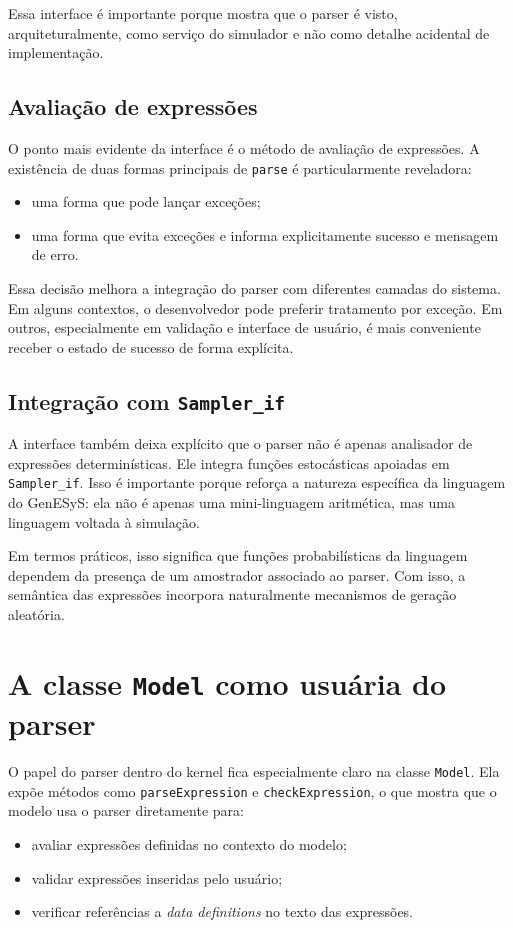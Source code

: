 Essa interface é importante porque mostra que o parser é visto, arquiteturalmente, como serviço do simulador e não como detalhe acidental de implementação.

\subsection{Avaliação de expressões}
\label{subsec:cap9_avaliacao_expressoes}

O ponto mais evidente da interface é o método de avaliação de expressões. A existência de duas formas principais de \texttt{parse} é particularmente reveladora:
\begin{itemize}
    \item uma forma que pode lançar exceções;
    \item uma forma que evita exceções e informa explicitamente sucesso e mensagem de erro.
\end{itemize}

Essa decisão melhora a integração do parser com diferentes camadas do sistema. Em alguns contextos, o desenvolvedor pode preferir tratamento por exceção. Em outros, especialmente em validação e interface de usuário, é mais conveniente receber o estado de sucesso de forma explícita.

\subsection{Integração com \texttt{Sampler\_if}}
\label{subsec:cap9_integracao_sampler_if}

A interface também deixa explícito que o parser não é apenas analisador de expressões determinísticas. Ele integra funções estocásticas apoiadas em \texttt{Sampler\_if}. Isso é importante porque reforça a natureza específica da linguagem do GenESyS: ela não é apenas uma mini-linguagem aritmética, mas uma linguagem voltada à simulação.

Em termos práticos, isso significa que funções probabilísticas da linguagem dependem da presença de um amostrador associado ao parser. Com isso, a semântica das expressões incorpora naturalmente mecanismos de geração aleatória.

\section{A classe \texttt{Model} como usuária do parser}
\label{sec:cap9_model_como_usuario_parser}

O papel do parser dentro do kernel fica especialmente claro na classe \texttt{Model}. Ela expõe métodos como \texttt{parseExpression} e \texttt{checkExpression}, o que mostra que o modelo usa o parser diretamente para:
\begin{itemize}
    \item avaliar expressões definidas no contexto do modelo;
    \item validar expressões inseridas pelo usuário;
    \item verificar referências a \textit{data definitions} no texto das expressões.
\end{itemize}

